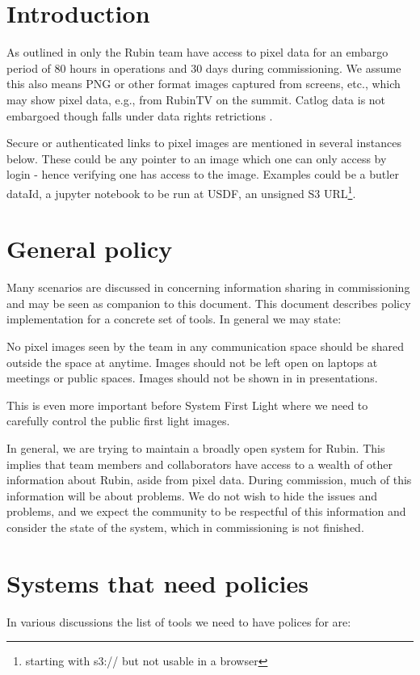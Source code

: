 
\section{Introduction}
As outlined in  only the Rubin team have access to pixel data for an embargo period of 80 hours in operations and 30 days during commissioning. We assume this also means PNG or other format images captured from screens, etc., which may show pixel data, e.g., from RubinTV on the summit.
Catlog data is not embargoed though falls under data rights retrictions .

Secure or authenticated links to pixel images are mentioned in several instances below.
These could be any pointer to an image which one can only access by login - hence verifying one has access to the image. Examples could be a butler dataId, a jupyter notebook to be run at USDF, an unsigned S3 URL\footnote{starting with s3:// but not usable in a browser}.


\section{General policy} \label{sec:genpol}
Many scenarios are discussed in  concerning information sharing in commissioning and may be seen as companion to this document.
This document describes policy implementation for a concrete set of tools.
In general we may state:

No pixel images seen by the team in any communication space should be shared outside the space at anytime.
Images should not be left open on laptops at meetings or public spaces.
Images should not be shown in in presentations.

This is even more important before System First Light where we need to carefully control the public first light images.

In general, we are trying to maintain a broadly open system for Rubin.
This implies that team members and collaborators have access to a wealth of other information about Rubin, aside from pixel data.
During commission, much of this information will be about problems.
We do not wish to hide the issues and problems, and we expect the community to be respectful of this information and consider the state of the system, which in commissioning is not finished.

\section {Systems that need policies}
In various discussions the list of tools we need to have polices for are:

